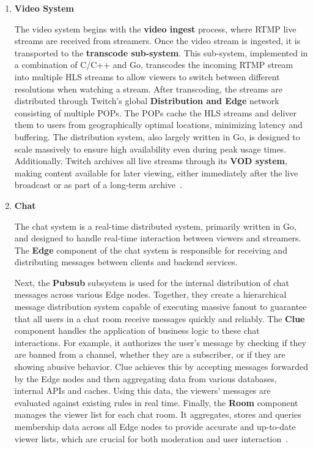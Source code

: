 \begin{enumerate}
    \item \textbf{Video System}
    
    The video system begins with the \textbf{video ingest} process, where \ac{RTMP} live streams are received from streamers. Once the video stream is ingested, it is transported to the \textbf{transcode sub-system}. 
    This sub-system, implemented in a combination of C/C++ and Go, transcodes the incoming \ac{RTMP} stream into multiple \ac{HLS} streams to allow viewers to switch between different resolutions when watching a stream.
    After transcoding, the streams are distributed through Twitch's global \textbf{Distribution and Edge} network consisting of multiple \ac{POPs}. The \ac{POPs} cache the \ac{HLS} streams and deliver them to users from geographically optimal locations, minimizing latency and buffering. The distribution system, also largely written in Go, is designed to scale massively to ensure high availability even during peak usage times.
    Additionally, Twitch archives all live streams through its \textbf{\ac{VOD} system}, making content available for later viewing, either immediately after the live broadcast or as part of a long-term archive~\parencite{twitch_engineering}.
    
    \item \textbf{Chat}

    The chat system is a real-time distributed system, primarily written in Go, and designed to handle real-time interaction between viewers and streamers. The \textbf{Edge} component of the chat system is responsible for receiving and distributing messages between clients and backend services.
    
    Next, the \textbf{Pubsub} subsystem is used for the internal distribution of chat messages across various Edge nodes. Together, they create a hierarchical message distribution system capable of executing massive fanout to guarantee that all users in a chat room receive messages quickly and reliably. The \textbf{Clue} component handles the application of business logic to these chat interactions. For example, it authorizes the user's message by checking if they are banned from a channel, whether they are a subscriber, or if they are showing abusive behavior. Clue achieves this by accepting messages forwarded by the Edge nodes and then aggregating data from various databases, internal \ac{API}s and caches. Using this data, the viewers' messages are evaluated against existing rules in real time. Finally, the \textbf{Room} component manages the viewer list for each chat room. It aggregates, stores and queries membership data across all Edge nodes to provide accurate and up-to-date viewer lists, which are crucial for both moderation and user interaction~\parencite{twitch_chat}.


\end{enumerate}
